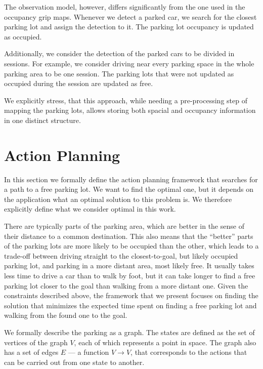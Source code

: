 The observation model, however, differs significantly from the one used in the
occupancy grip maps. Whenever we detect a parked car, we search for the
closest parking lot and assign the detection to it. The parking lot occupancy
is updated as occupied.

Additionally, we consider the detection of the parked cars to be divided in
sessions. For example, we consider driving near every parking space in the
whole parking area to be one session. The parking lots that were not updated
as occupied during the session are updated as free.

We explicitly stress, that this approach, while needing a pre-processing step
of mapping the parking lots, allows storing both spacial and occupancy
information in one distinct structure.


\section{Action Planning} %
\label{sec:action_planning}

In this section we formally define the action planning framework that searches
for a path to a free parking lot. We want to find the optimal one, but it
depends on the application what an optimal solution to this problem is. We
therefore explicitly define what we consider optimal in this work.

There are typically parts of the parking area, which are better in the sense
of their distance to a common destination. This also means that the ``better''
parts of the parking lots are more likely to be occupied than the other, which
leads to a trade-off between driving straight to the closest-to-goal, but
likely occupied parking lot, and parking in a more distant area, most likely
free. It usually takes less time to drive a car than to walk by foot, but it
can take longer to find a free parking lot closer to the goal than walking
from a more distant one. Given the constraints described above, the framework
that we present focuses on finding the solution that minimizes the expected
time spent on finding a free parking lot and walking from the found one to the
goal.

We formally describe the parking as a graph. The states are defined as the set
of vertices of the graph $V$, each of which represents a point in space. The
graph also has a set of edges $E$ --- a function $V \rightarrow V$, that
corresponds to the actions that can be carried out from one state to another.

